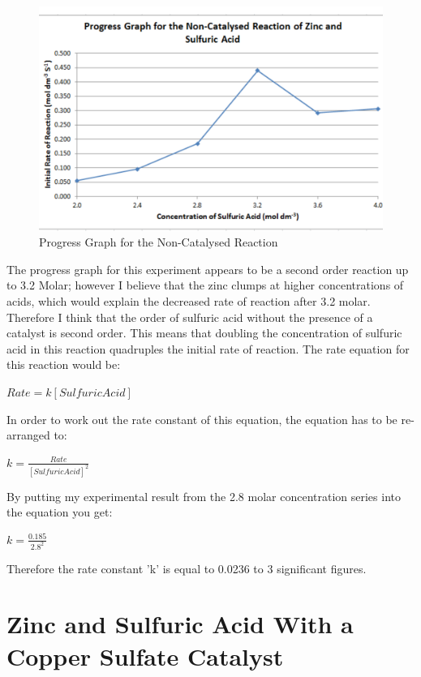 \begin{figure}[H]
    \includegraphics[width=\textwidth]{./Analysis/Images/1NonCatalyst/ProgressGraph.pdf}
    \caption{Progress Graph for the Non-Catalysed Reaction} \label{fig:ProgressGraphSA}
\end{figure}

The progress graph for this experiment appears to be a second order reaction up to 3.2 Molar; however I believe that the zinc clumps at higher concentrations of acids, which would explain the decreased rate of reaction after 3.2 molar. Therefore I think that the order of sulfuric acid without the presence of a catalyst is second order. This means that doubling the concentration of sulfuric acid in this reaction quadruples the initial rate of reaction. The rate equation for this reaction would be:

$Rate = k [Sulfuric Acid]$

In order to work out the rate constant of this equation, the equation has to be re-arranged to:

$k = \frac{Rate}{[Sulfuric Acid]^2}$

By putting my experimental result from the 2.8 molar concentration series into the equation you get:

$k = \frac{0.185}{2.8^2}$

Therefore the rate constant 'k' is equal to 0.0236 to 3 significant figures.



\section{Zinc and Sulfuric Acid With a Copper Sulfate Catalyst}



